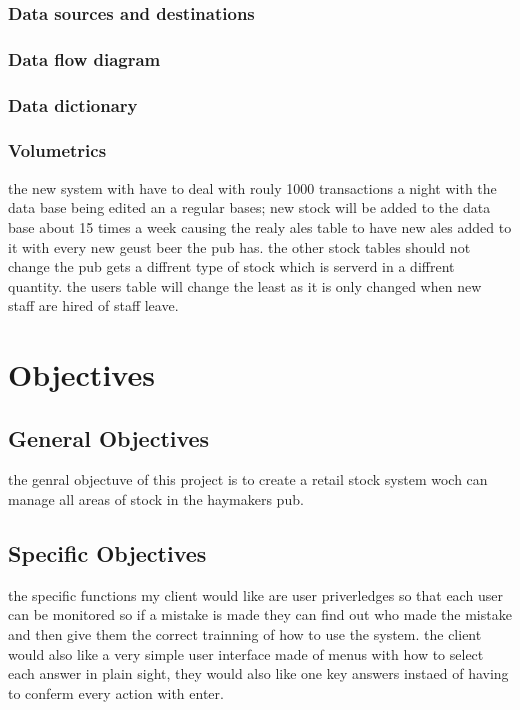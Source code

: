 \subsubsection{Data sources and destinations}

\subsubsection{Data flow diagram}

\subsubsection{Data dictionary}

\subsubsection{Volumetrics}

 the new system with have to deal with rouly 1000 transactions a night with the data base being edited an a regular bases; new stock will be added to the data base about 15 times a week causing the realy ales table to have new ales added to it with every new geust beer the pub has. the other stock tables should not change the pub gets a diffrent type of stock which is serverd in a diffrent quantity. the users table will change the least as it is only changed when new staff are hired of staff leave.

\section{Objectives}

\subsection{General Objectives}

the genral objectuve of this project is to create a retail stock system woch can manage all areas of stock in the haymakers pub.

\subsection{Specific Objectives}

the specific functions my client would like are user priverledges so that each user can be monitored so if a mistake is made they can find out who made the mistake and then give them the correct trainning of how to use the system. the client would also like a very simple user interface made of menus with how to select each answer in plain sight, they would also like one key answers instaed of having to conferm every action with enter.

